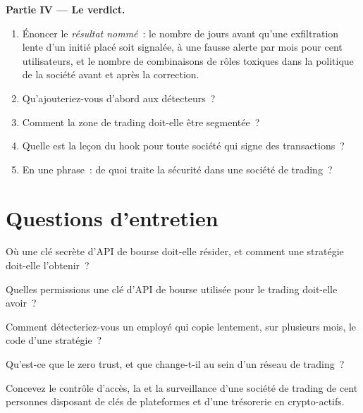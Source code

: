 \begin{problem}
\medskip\noindent\textbf{Partie IV --- Le verdict.}
\begin{enumerate}[resume]
\item Énoncer le \emph{résultat nommé}~: le nombre de jours avant qu'une exfiltration lente d'un initié placé soit signalée, à une fausse alerte par mois pour cent utilisateurs,
et le nombre de combinaisons de rôles toxiques dans la politique de la société avant et après la correction.
\item Qu'ajouteriez-vous d'abord aux détecteurs~?
\item Comment la zone de trading doit-elle être segmentée~?
\item Quelle est la leçon du hook pour toute société qui signe des transactions~?
\item En une phrase~: de quoi traite la sécurité dans une société de trading~?
\end{enumerate}
\end{problem}

\section{Questions d'entretien}

\begin{interviewq}\label{iq:pl:security:1}
Où une clé secrète d'API de bourse doit-elle résider, et comment une stratégie doit-elle l'obtenir~?
\end{interviewq}

\begin{interviewq}\label{iq:pl:security:2}
Quelles permissions une clé d'API de bourse utilisée pour le trading doit-elle avoir~?
\end{interviewq}

\begin{interviewq}\label{iq:pl:security:3}
Comment détecteriez-vous un employé qui copie lentement, sur plusieurs mois, le code d'une stratégie~?
\end{interviewq}

\begin{interviewq}\label{iq:pl:security:4}
Qu'est-ce que le zero trust, et que change-t-il au sein d'un réseau de trading~?
\end{interviewq}

\begin{interviewq}\label{iq:pl:security:5}
Concevez le contrôle d'accès, la  et la surveillance d'une société de trading de cent personnes disposant de clés de plateformes et d'une trésorerie en crypto-actifs.
\end{interviewq}
